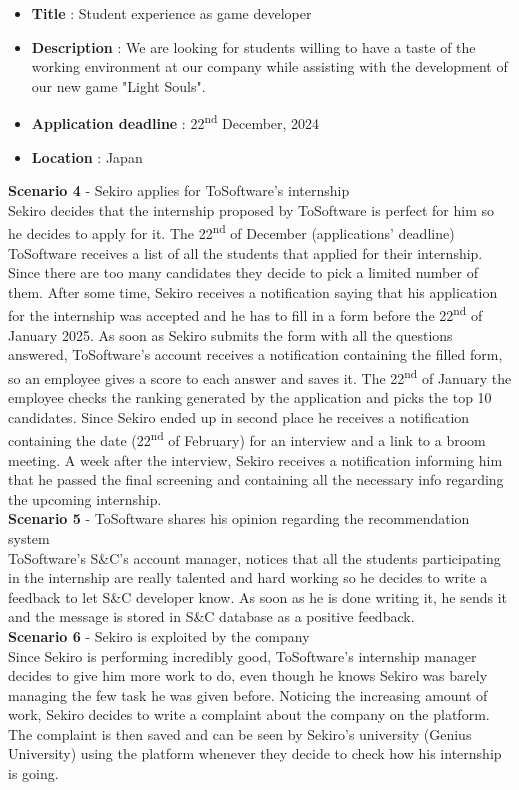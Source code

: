 \documentclass[11pt,twoside]{article}
\begin{document}
\begin{itemize}
\item[] \textbf{Title} : Student experience as game developer
\item[] \textbf{Description} : We are looking for students willing to have a taste of the working environment at our company while assisting with the development of our new game "Light Souls".
\item[] \textbf{Application deadline} : 22\textsuperscript{nd} December, 2024
\item[] \textbf{Location} : Japan
\end{itemize}
\vspace{1\baselineskip}
\textbf{\large{Scenario 4}} - Sekiro applies for ToSoftware's internship \\
Sekiro decides that the internship proposed by ToSoftware is perfect for him so he decides to apply for it. The 22\textsuperscript{nd} of December (applications' deadline) ToSoftware receives a list of all the students that applied for their internship. Since there are too many candidates they decide to pick a limited number of them. After some time, Sekiro receives a notification saying that his application for the internship was accepted and he has to fill in a form before the 22\textsuperscript{nd} of January 2025. As soon as Sekiro submits the form with all the questions answered, ToSoftware's account receives a notification containing the filled form, so an employee gives a score to each answer and saves it. The 22\textsuperscript{nd} of January the employee checks the ranking generated by the application and picks the top 10 candidates. Since Sekiro ended up in second place he receives a notification containing the date (22\textsuperscript{nd} of February) for an interview and a link to a broom meeting. A week after the interview, Sekiro receives a notification informing him that he passed the final screening and containing all the necessary info regarding the upcoming internship.  
\vspace{1\baselineskip} \\
\textbf{\large{Scenario 5}} - ToSoftware shares his opinion regarding the recommendation system \\
ToSoftware's S\&C's account manager, notices that all the students participating in the internship are really talented and hard working so he decides to write a feedback to let S\&C developer know. As soon as he is done writing it, he sends it and the message is stored in S\&C database as a positive feedback.
\vspace{1\baselineskip} \\
\textbf{\large{Scenario 6}} - Sekiro is exploited by the company \\
Since Sekiro is performing incredibly good, ToSoftware's internship manager decides to give him more work to do, even though he knows Sekiro was barely managing the few task he was given before. Noticing the increasing amount of work, Sekiro decides to write a complaint about the company on the platform. The complaint is then saved and can be seen by Sekiro's university (Genius University) using the platform whenever they decide to check how his internship is going.
\newpage
\end{document}
